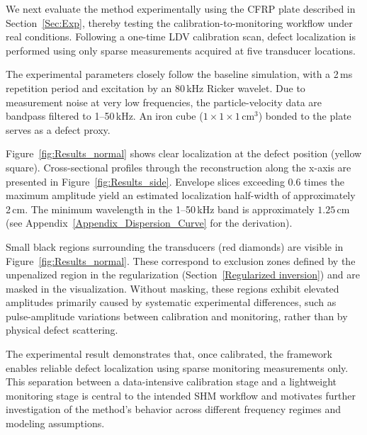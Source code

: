 \documentclass[a4paper,fleqn]{cas-sc}
\begin{document}
We next evaluate the method experimentally using the CFRP plate described in Section~\ref{Sec:Exp}, thereby testing the calibration-to-monitoring workflow under real conditions. Following a one-time LDV calibration scan, defect localization is performed using only sparse measurements acquired at five transducer locations.

The experimental parameters closely follow the baseline simulation, with a 2\,ms repetition period and excitation by an 80\,kHz Ricker wavelet. Due to measurement noise at very low frequencies, the particle-velocity data are bandpass filtered to 1--50\,kHz. An iron cube ($1\times1\times1\,\mathrm{cm}^3$) bonded to the plate serves as a defect proxy.

Figure~\ref{fig:Results_normal} shows clear localization at the defect position (yellow square). Cross-sectional profiles through the reconstruction along the x-axis are presented in Figure~\ref{fig:Results_side}. Envelope slices exceeding 0.6 times the maximum amplitude yield an estimated localization half-width of approximately 2\,cm. The minimum wavelength in the 1--50\,kHz band is approximately $1.25\,\mathrm{cm}$ (see Appendix~\ref{Appendix_Dispersion_Curve} for the derivation).

Small black regions surrounding the transducers (red diamonds) are visible in Figure~\ref{fig:Results_normal}. These correspond to exclusion zones defined by the unpenalized region in the regularization (Section~\ref{Regularized inversion}) and are masked in the visualization. Without masking, these regions exhibit elevated amplitudes primarily caused by systematic experimental differences, such as pulse-amplitude variations between calibration and monitoring, rather than by physical defect scattering.

The experimental result demonstrates that, once calibrated, the framework enables reliable defect localization using sparse monitoring measurements only. This separation between a data-intensive calibration stage and a lightweight monitoring stage is central to the intended SHM workflow and motivates further investigation of the method's behavior across different frequency regimes and modeling assumptions.
\end{document}
